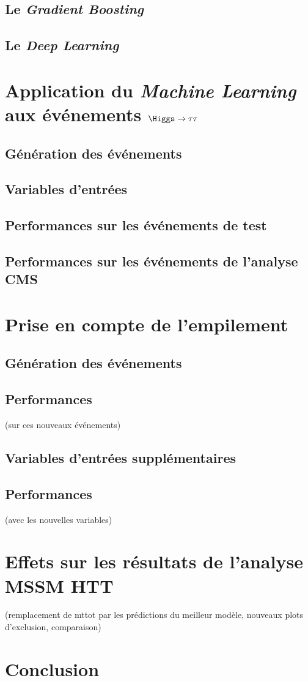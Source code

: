 \subsection{Le \emph{Gradient Boosting}}
\subsection{Le \emph{Deep Learning}}

\section{Application du \emph{Machine Learning} aux événements $\Higgs\to\tau\tau$}
\subsection{Génération des événements}
\subsection{Variables d'entrées}
\subsection{Performances sur les événements de test}
\subsection{Performances sur les événements de l'analyse CMS}

\section{Prise en compte de l'empilement}
\subsection{Génération des événements}
\subsection{Performances} (sur ces nouveaux événements)
\subsection{Variables d'entrées supplémentaires}
\subsection{Performances} (avec les nouvelles variables)

\section{Effets sur les résultats de l'analyse MSSM HTT}
(remplacement de mttot par les prédictions du meilleur modèle, nouveaux plots d'exclusion, comparaison)

\section{Conclusion}